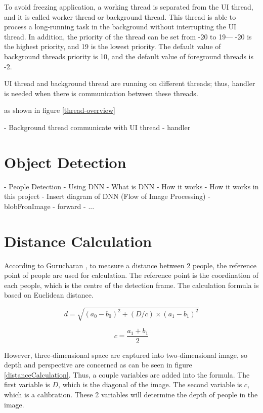         To avoid freezing application, a working thread is separated from the UI thread,
            and it is called worker thread or background thread.
            This thread is able to process a long-running task in the background without interrupting the UI thread.
        In addition, the priority of the thread can be set from -20 to 19--- -20
            is the highest priority, and 19 is the lowest priority.
            The default value of background threads priority is 10,
            and the default value of foreground threads is -2.

        UI thread and background thread are running on different threads;
        thus, handler is needed when there is communication between these threads.

        as shown in figure \ref{thread-overview}

        - Background thread communicate with UI thread
            - handler


    \section{Object Detection}
        -	People Detection
            - Using DNN
            - What is DNN
            - How it works
            - How it works in this project
                - Insert diagram of DNN (Flow of Image Processing)
                    - blobFronImage
                    - forward
                    - ...

    \section{Distance Calculation}\label{sectionDistanceCalculation}
        According to Gurucharan \cite{SOCIAL-DISTANCING-DETECTION}, to measure a distance between 2 people, the reference point of people are used for calculation.
        The reference point is the coordination of each people, which is the centre of the detection frame.
        The calculation formula is based on Euclidean distance.

        \begin{equation*}
            d = \sqrt{(a_{0}-b_{0})^{2}+(D/c)\times(a_{1}-b_{1})^{2}}
        \end{equation*}

        \begin{equation*}
            c = \frac{a_{1}+b_{1}}{2}
        \end{equation*}

        However, three-dimensional space are captured into two-dimensional image,
        so depth and perspective are concerned as can be seen in figure \ref{distanceCalculation}.
        Thus, a couple variables are added into the formula.
        The first variable is $D$, which is the diagonal of the image.
        The second variable is $c$, which is a calibration.
        These 2 variables will determine the depth of people in the image.

